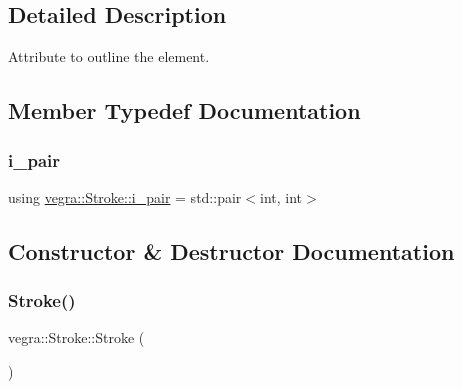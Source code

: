 \subsection{Detailed Description}
Attribute to outline the element. 

\subsection{Member Typedef Documentation}
\mbox{\label{structvegra_1_1Stroke_af5a2b4ee71962d044ebb7a309b22bb8a}} 
\subsubsection{\texorpdfstring{i\+\_\+pair}{i\_pair}}
{\footnotesize\ttfamily using \mbox{\hyperlink{structvegra_1_1Stroke_af5a2b4ee71962d044ebb7a309b22bb8a}{vegra\+::\+Stroke\+::i\+\_\+pair}} =  std\+::pair$<$int, int$>$}



\subsection{Constructor \& Destructor Documentation}
\mbox{\label{structvegra_1_1Stroke_a64be83054d51672b104626cefdb303d4}} 
\subsubsection{\texorpdfstring{Stroke()}{Stroke()}\hspace{0.1cm}{\footnotesize\ttfamily [1/2]}}
{\footnotesize\ttfamily vegra\+::\+Stroke\+::\+Stroke (\begin{DoxyParamCaption}{ }\end{DoxyParamCaption})\hspace{0.3cm}{\ttfamily [inline]}}

\mbox{\label{structvegra_1_1Stroke_a48ed9ac6ddee81297219d76534a71f8e}} 
